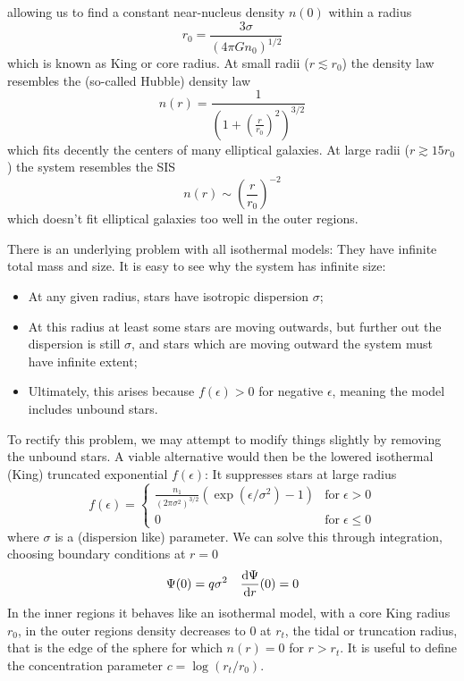 allowing us to find a constant near-nucleus density $n(0)$ within a radius 
\begin{equation}
    r_{0} = \frac{3\sigma}{(4\pi G n_{0})^{1/2}}
    \label{eq:kingradius}
\end{equation}
which is known as King or core radius. At small radii ($r \lesssim r_{0}$) the density law resembles the (so-called Hubble) density law
\begin{equation*}
    n(r) = \frac{1}{\left(1+\left(\frac{r}{r_{0}}\right)^{2}\right)^{3/2}}
\end{equation*}
which fits decently the centers of many elliptical galaxies. At large radii ($r\gtrsim 15r_{0}$) the system resembles the SIS
\begin{equation*}
    n(r) \sim \left(\frac{r}{r_{0}}\right)^{-2}
\end{equation*}
which doesn't fit elliptical galaxies too well in the outer regions.
\par There is an underlying problem with all isothermal models: They have infinite total mass and size. It is easy to see why the system has infinite size:
\begin{itemize}
    \item At any given radius, stars have isotropic dispersion $\sigma$;
    \item At this radius at least some stars are moving outwards, but further out the dispersion is still $\sigma$, and stars which are moving outward the system must have infinite extent;
    \item Ultimately, this arises because $f(\epsilon) > 0$ for negative $\epsilon$, meaning the model includes unbound stars.
\end{itemize}
\par To rectify this problem, we may attempt to modify things slightly by removing the unbound stars. A viable alternative would then be the lowered isothermal (King) truncated exponential $f(\epsilon)$: It suppresses stars at large radius
\begin{equation*}
    f(\epsilon) = \left\{
        \begin{array}{ll}
            \frac{n_{1}}{(2\pi\sigma^{2})^{3/2}}\left(\exp\left(\epsilon/\sigma^{2}\right)-1\right) & \text{for}\; \epsilon > 0\\
            0 & \text{for}\; \epsilon \leq 0
        \end{array}
    \right.
\end{equation*}
where $\sigma$ is a (dispersion like) parameter. We can solve this through integration, choosing boundary conditions at $r = 0$
\begin{equation*}
    \Psi(0) = q\sigma^{2} \quad \frac{\text{d}\Psi}{\text{d}r}(0) = 0
\end{equation*}
In the inner regions it behaves like an isothermal model, with a core King radius $r_{0}$, in the outer regions density decreases to $0$ at $r_{t}$, the tidal or truncation radius, that is the edge of the sphere for which $n(r) = 0$ for $r>r_{t}$. It is useful to define the concentration parameter $c = \log(r_{t}/r_{0})$.

